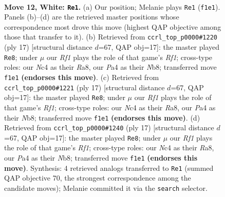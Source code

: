 \documentclass[11pt]{article}
\begin{document}
\clearpage

\begin{figure}[p]\centering
\begin{subfigure}{0.46\textwidth}\centering
\resizebox{\linewidth}{!}{%
\newchessgame
\chessboard[
  setfen={r2r2k1/ppqbbppp/n1p1pn2/8/P1NP4/1P3PP1/4P1BP/RNBQ1RK1 w - - 1 12},
  showmover=false,
  pgfstyle=straightmove, color=movearrow, markmove={f1-e1}
]}
\caption{}
\end{subfigure}\hfill
\begin{subfigure}{0.46\textwidth}\centering
\resizebox{\linewidth}{!}{%
\newchessgame
\chessboard[
  setfen={rnbq1rk1/pp3pbp/3p1np1/2pP4/8/2N2NP1/PP2PPBP/R1BQ1RK1 b - - 5 9},
  showmover=false,
  pgfstyle=straightmove, color=movearrow, markmove={f8-e8}
]}
\caption{}
\end{subfigure}
\\[4pt]
\begin{subfigure}{0.46\textwidth}\centering
\resizebox{\linewidth}{!}{%
\newchessgame
\chessboard[
  setfen={rnbq1rk1/pp3pbp/3p1np1/2pP4/8/2N2NP1/PP2PPBP/R1BQ1RK1 b - - 5 9},
  showmover=false,
  pgfstyle=straightmove, color=movearrow, markmove={f8-e8}
]}
\caption{}
\end{subfigure}\hfill
\begin{subfigure}{0.46\textwidth}\centering
\resizebox{\linewidth}{!}{%
\newchessgame
\chessboard[
  setfen={rnbq1rk1/pp3pbp/3p1np1/2pP4/8/2N2NP1/PP2PPBP/R1BQ1RK1 b - - 5 9},
  showmover=false,
  pgfstyle=straightmove, color=movearrow, markmove={f8-e8}
]}
\caption{}
\end{subfigure}
\caption{\textbf{Move 12, White: \texttt{Re1}.} (a) Our position; Melanie plays \texttt{Re1} (\texttt{f1e1}). Panels (b)--(d) are the retrieved master positions whose correspondence most drove this move (highest QAP objective among those that transfer to it). (b) Retrieved from \texttt{ccrl\_top\_p0000\#1220} (ply 17) [structural distance $d$=67, QAP obj=17]: the master played \texttt{Re8}; under $\mu$ our \emph{Rf1} plays the role of that game's \emph{Rf1}; cross-type roles: our \emph{N}c4 as their \emph{R}a8, our \emph{P}a4 as their \emph{N}b8; transferred move \texttt{f1e1} \textbf{(endorses this move)}. (c) Retrieved from \texttt{ccrl\_top\_p0000\#1221} (ply 17) [structural distance $d$=67, QAP obj=17]: the master played \texttt{Re8}; under $\mu$ our \emph{Rf1} plays the role of that game's \emph{Rf1}; cross-type roles: our \emph{N}c4 as their \emph{R}a8, our \emph{P}a4 as their \emph{N}b8; transferred move \texttt{f1e1} \textbf{(endorses this move)}. (d) Retrieved from \texttt{ccrl\_top\_p0000\#1240} (ply 17) [structural distance $d$=67, QAP obj=17]: the master played \texttt{Re8}; under $\mu$ our \emph{Rf1} plays the role of that game's \emph{Rf1}; cross-type roles: our \emph{N}c4 as their \emph{R}a8, our \emph{P}a4 as their \emph{N}b8; transferred move \texttt{f1e1} \textbf{(endorses this move)}. Synthesis: 4 retrieved analogs transferred to \texttt{Re1} (summed QAP objective 70, the strongest correspondence among the candidate moves); Melanie committed it via the \texttt{search} selector.}
\label{fig:thought-m22}
\end{figure}
\end{document}
